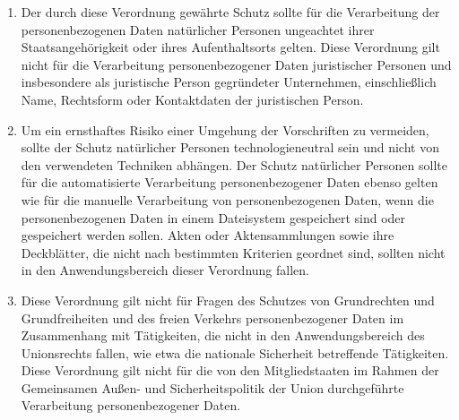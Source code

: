 \begin{enumerate}

   \item Der durch diese Verordnung gewährte Schutz sollte für die Verarbeitung der personenbezogenen Daten natürlicher
    Personen ungeachtet ihrer Staatsangehörigkeit oder ihres Aufenthaltsorts gelten. Diese Verordnung gilt nicht für
    die Verarbeitung personenbezogener Daten juristischer Personen und insbesondere als juristische Person gegründeter
    Unternehmen, einschließlich Name, Rechtsform oder Kontaktdaten der juristischen Person.%
   \label{eg:14}
   

   \item Um ein ernsthaftes Risiko einer Umgehung der Vorschriften zu vermeiden, sollte der Schutz natürlicher Personen
    technologieneutral sein und nicht von den verwendeten Techniken abhängen. Der Schutz natürlicher Personen sollte
    für die automatisierte Verarbeitung personenbezogener Daten ebenso gelten wie für die manuelle Verarbeitung von
    personenbezogenen Daten, wenn die personenbezogenen Daten in einem Dateisystem gespeichert sind oder gespeichert
    werden sollen. Akten oder Aktensammlungen sowie ihre Deckblätter, die nicht nach bestimmten Kriterien geordnet
    sind, sollten nicht in den Anwendungsbereich dieser Verordnung fallen.%
   \label{eg:15}
   

   \item Diese Verordnung gilt nicht für Fragen des Schutzes von Grundrechten und Grundfreiheiten und des freien
    Verkehrs personenbezogener Daten im Zusammenhang mit Tätigkeiten, die nicht in den Anwendungsbereich des
    Unionsrechts fallen, wie etwa die nationale Sicherheit betreffende Tätigkeiten. Diese Verordnung gilt nicht für die
    von den Mitgliedstaaten im Rahmen der Gemeinsamen Außen- und Sicherheitspolitik der Union durchgeführte
    Verarbeitung personenbezogener Daten.%
   \label{eg:16}
   


\end{enumerate}
